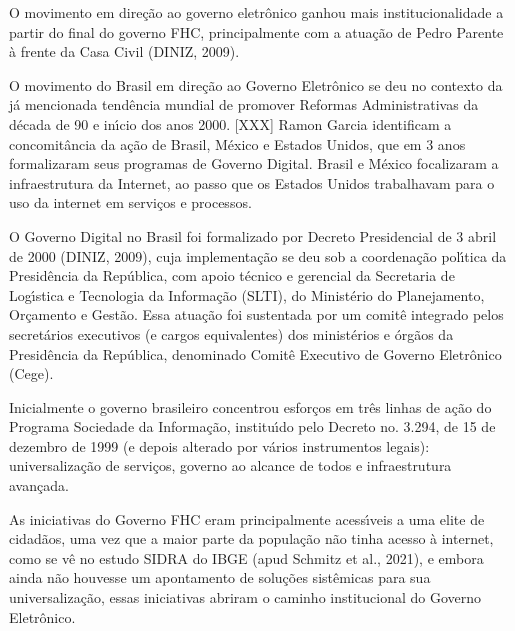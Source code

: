 \documentclass[
12pt,		%
openright,	%
twoside,  %
a4paper,			%
chapter=TITLE,		%
english,			%
french,				%
spanish,			%
brazil				%
]{USPSC-classe/USPSC}
\begin{document}
O movimento em dire\c{c}\~ao ao governo eletr\^onico ganhou mais institucionalidade a partir do final do governo FHC, principalmente com a atua\c{c}\~ao de Pedro Parente \`a frente da Casa Civil  (DINIZ, 2009).




O movimento do Brasil em dire\c{c}\~ao ao Governo Eletr\^onico se deu no contexto da j\'a mencionada tend\^encia mundial de promover Reformas Administrativas da d\'ecada de 90 e in\'{\i}cio dos anos 2000. [XXX] Ramon Garcia identificam a concomit\^ancia da a\c{c}\~ao de Brasil, M\'exico e Estados Unidos, que em 3 anos formalizaram seus programas de Governo Digital. Brasil e M\'exico focalizaram a infraestrutura da Internet, ao passo que os Estados Unidos trabalhavam para o uso da internet em servi\c{c}os e processos.




O Governo Digital no Brasil foi formalizado por Decreto Presidencial de 3 abril de 2000  (DINIZ, 2009), cuja implementa\c{c}\~ao se deu sob a coordena\c{c}\~ao pol\'{\i}tica da Presid\^encia da Rep\'ublica, com apoio t\'ecnico e gerencial da Secretaria de Log\'{\i}stica e Tecnologia da Informa\c{c}\~ao (SLTI), do Minist\'erio do Planejamento, Or\c{c}amento e Gest\~ao. Essa atua\c{c}\~ao foi sustentada por um comit\^e integrado pelos secret\'arios executivos (e cargos equivalentes) dos minist\'erios e \'org\~aos da Presid\^encia da Rep\'ublica, denominado Comit\^e Executivo de Governo Eletr\^onico (Cege).




Inicialmente o governo brasileiro concentrou esfor\c{c}os em tr\^es linhas de a\c{c}\~ao do Programa Sociedade da Informa\c{c}\~ao, institu\'{\i}do pelo Decreto no. 3.294, de 15 de dezembro de 1999 (e depois alterado por v\'arios instrumentos legais): universaliza\c{c}\~ao de servi\c{c}os, governo ao alcance de todos e infraestrutura avan\c{c}ada.




As iniciativas do Governo FHC eram principalmente acess\'{\i}veis a uma elite de cidad\~aos, uma vez que a maior parte da popula\c{c}\~ao n\~ao tinha acesso \`a internet, como se v\^e no estudo SIDRA do IBGE (apud Schmitz et al., 2021), e embora ainda n\~ao houvesse um apontamento de solu\c{c}\~oes sist\^emicas para sua universaliza\c{c}\~ao, essas iniciativas abriram o caminho institucional do Governo Eletr\^onico.
\end{document}
